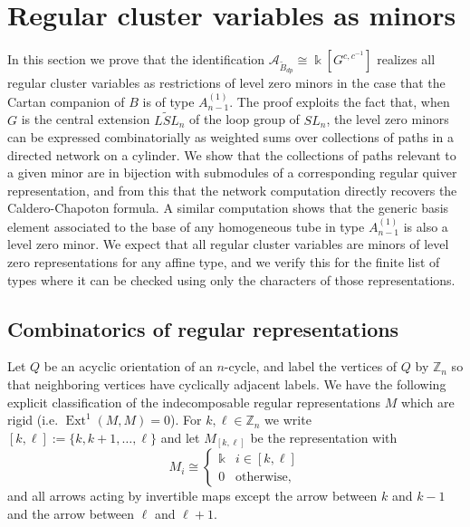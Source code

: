 \documentclass[12pt]{amsart}
\newcommand{\cA}{\mathcal{A}}
\newcommand{\ZZ}{\mathbb{Z}}
\newcommand{\kk}{\Bbbk}
\DeclareMathOperator{\Ext}{Ext}
\newcommand{\Bdp}{\widetilde{B}_{dp}}
\newcommand{\Qrep}{M}
\theoremstyle{remark}
\numberwithin{equation}{section}
\numberwithin{figure}{section}
\begin{document}
\section{Regular cluster variables as minors}

In this section we prove that the identification $\cA_{\Bdp} \cong \kk[G^{c,c^{-1}}]$ realizes all regular cluster variables as restrictions of level zero minors in the case that the Cartan companion of $B$ is of type $A_{n-1}^{\!(1)}$.
The proof exploits the fact that, when $G$ is the central extension $\widetilde{LSL}_n$ of the loop group of $SL_n$, the level zero minors can be expressed combinatorially as weighted sums over collections of paths in a directed network on a cylinder.
We show that the collections of paths relevant to a given minor are in bijection with submodules of a corresponding regular quiver representation, and from this that the network computation directly recovers the Caldero-Chapoton formula.
A similar computation shows that the generic basis element associated to the base of any homogeneous tube in type $A_{n-1}^{\!(1)}$ is also a level zero minor.
We expect that all regular cluster variables are minors of level zero representations for any affine type, and we verify this for the finite list of types where it can be checked using only the characters of those representations.

\subsection{Combinatorics of regular representations}
\label{sec:rigidregular}
Let $Q$ be an acyclic orientation of an $n$-cycle, and label the vertices of $Q$ by $\ZZ_n$ so that neighboring vertices have cyclically adjacent labels.
We have the following explicit classification of the indecomposable regular representations $\Qrep$ which are rigid (i.e. $\Ext^1(\Qrep,\Qrep)=0$).
For $k,\ell\in\ZZ_n$ we write $[k,\ell]:=\{k,k+1,\ldots,\ell\}$ and let $\Qrep_{[k,\ell]}$ be the representation with
\[
  \Qrep_i \cong \begin{cases} \kk & i \in [k,\ell] \\ 0 & \text{otherwise,} \end{cases}
\]
and all arrows acting by invertible maps except the arrow between $k$ and $k-1$ and the arrow between $\ell$ and $\ell + 1$.
\end{document}
